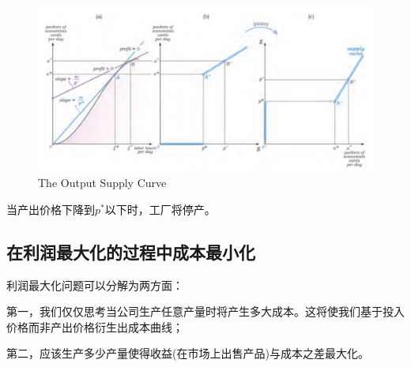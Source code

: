 \documentclass{article}
\begin{document}
\begin{figure}[H] %
	\centering %
	\includegraphics[width=1\textwidth]{11_7} %
	\caption{The Output Supply Curve} %
	\label{Fig.main8} %
\end{figure}

当产出价格下降到$ p^* $以下时，工厂将停产。

\subsection{在利润最大化的过程中成本最小化}

利润最大化问题可以分解为两方面：

第一，我们仅仅思考当公司生产任意产量时将产生多大成本。这将使我们基于投入价格而非产出价格衍生出成本曲线；

第二，应该生产多少产量使得收益(在市场上出售产品)与成本之差最大化。
\end{document}
